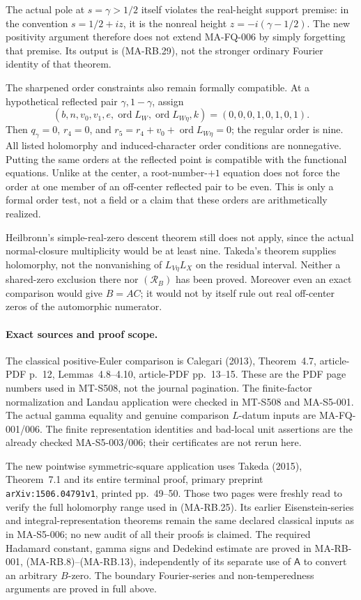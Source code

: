 The actual pole at \(s=\gamma>1/2\) itself violates
the real-height support premise: in the convention
\(s=1/2+iz\), it is the nonreal height
\(z=-i(\gamma-1/2)\).
The new positivity argument therefore does not extend
MA-FQ-006 by simply forgetting that premise.
Its output is (MA-RB.29), not the stronger ordinary
Fourier identity of that theorem.

The sharpened order constraints also remain formally
compatible.  At a hypothetical reflected pair
\(\gamma,1-\gamma\), assign
\[
 (b,n,v_0,v_1,e,\operatorname{ord}L_W,
                      \operatorname{ord}L_{W\eta},k)
                         =(0,0,0,1,0,1,0,1).
 \tag{MA-RB.37}
\]
Then \(q_\gamma=0\), \(r_4=0\), and
\(r_5=r_4+v_0+\operatorname{ord}L_{W\eta}=0\);
the regular order is nine.
All listed holomorphy and induced-character order
conditions are nonnegative.  Putting the same orders
at the reflected point is compatible with the
functional equations.  Unlike at the center, a
root-number-\(+1\) equation does not force the order
at one member of an off-center reflected pair to be
even.  This is only a formal order test, not a field
or a claim that these orders are arithmetically realized.

Heilbronn's simple-real-zero descent theorem still does
not apply, since the actual normal-closure multiplicity
would be at least nine.  Takeda's theorem supplies
holomorphy, not the nonvanishing of \(L_{V\eta}L_X\)
on the residual interval.  Neither a shared-zero
exclusion there nor \((\mathcal R_B)\) has been proved.
Moreover even an exact comparison would give
\(B=A C\); it would not by itself rule out real
off-center zeros of the automorphic numerator.

\paragraph{Exact sources and proof scope.}
The classical positive-Euler comparison is Calegari
(2013), Theorem~4.7, article-PDF p.~12, Lemmas~4.8--4.10,
article-PDF pp.~13--15.  These are the PDF page numbers
used in MT-S508, not the journal pagination.
The finite-factor normalization and
Landau application were checked in MT-S508 and MA-S5-001.
The actual gamma equality and genuine comparison
\(L\)-datum inputs are MA-FQ-001/006.
The finite representation identities and bad-local
unit assertions are the already checked MA-S5-003/006;
their certificates are not rerun here.

The new pointwise symmetric-square application uses
Takeda (2015), Theorem~7.1 and its entire terminal proof,
primary preprint \texttt{arXiv:1506.04791v1},
printed pp.~49--50.
Those two pages were freshly read to verify the
full holomorphy range used in (MA-RB.25).
Its earlier Eisenstein-series and integral-representation
theorems remain the same declared classical inputs
as in MA-S5-006; no new audit of all their proofs is
claimed.
The required Hadamard constant, gamma signs and
Dedekind estimate are proved in MA-RB-001,
(MA-RB.8)--(MA-RB.13), independently of its separate
use of \(\mathsf A\) to convert an arbitrary \(B\)-zero.
The boundary Fourier-series and non-temperedness
arguments are proved in full above.

